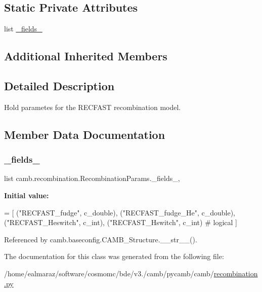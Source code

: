\subsection*{Static Private Attributes}
\begin{DoxyCompactItemize}
\item 
list \mbox{\hyperlink{classcamb_1_1recombination_1_1RecombinationParams_afece592399354774f1823c95ae35d76c}{\+\_\+fields\+\_\+}}
\end{DoxyCompactItemize}
\subsection*{Additional Inherited Members}


\subsection{Detailed Description}
\begin{DoxyVerb}Hold parametes for the RECFAST recombination model.
\end{DoxyVerb}
 

\subsection{Member Data Documentation}
\mbox{\label{classcamb_1_1recombination_1_1RecombinationParams_afece592399354774f1823c95ae35d76c}} 
\subsubsection{\texorpdfstring{\+\_\+fields\+\_\+}{\_fields\_}}
{\footnotesize\ttfamily list camb.\+recombination.\+Recombination\+Params.\+\_\+fields\+\_\+\hspace{0.3cm}{\ttfamily [static]}, {\ttfamily [private]}}

{\bfseries Initial value\+:}
\begin{DoxyCode}
=  [
        (\textcolor{stringliteral}{"RECFAST\_fudge"}, c\_double),
        (\textcolor{stringliteral}{"RECFAST\_fudge\_He"}, c\_double),
        (\textcolor{stringliteral}{"RECFAST\_Heswitch"}, c\_int),
        (\textcolor{stringliteral}{"RECFAST\_Hswitch"}, c\_int)  \textcolor{comment}{# logical}
    ]
\end{DoxyCode}


Referenced by camb.\+baseconfig.\+C\+A\+M\+B\+\_\+\+Structure.\+\_\+\+\_\+str\+\_\+\+\_\+().



The documentation for this class was generated from the following file\+:\begin{DoxyCompactItemize}
\item 
/home/ealmaraz/software/cosmomc/bde/v3./camb/pycamb/camb/\mbox{\hyperlink{recombination_8py}{recombination.\+py}}\end{DoxyCompactItemize}
